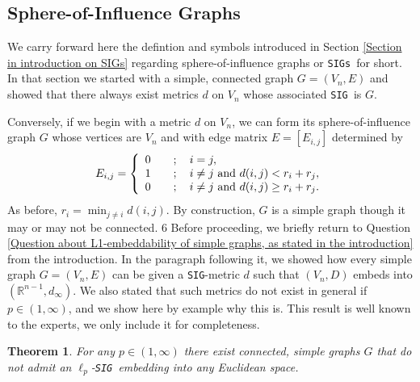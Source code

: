 \documentclass[12pt]{amsart}
\newtheorem{theorem}{Theorem}
\numberwithin{theorem}{section}
\theoremstyle{remark}
\newcommand{\sig}{{\tt SIG }}
\newcommand{\sigg}{{\tt SIG}}
\newcommand{\sigs}{{\tt SIGs }}
\begin{document}
\subsection{Sphere-of-Influence Graphs} \label{Subsection on sphere of influence graphs}
We carry forward here the defintion and symbols introduced in Section \ref{Section in introduction on SIGs} regarding sphere-of-influence graphs or \sigs for short. In that section we started with a simple, connected graph $G = (V_n,E)$ and  showed that there always exist metrics $d$ on $V_n$ whose associated \sig is $G$. 

Conversely, if we begin with a metric $d$ on $V_n$, we can form its sphere-of-influence graph $G$ whose vertices are $V_n$ and with edge matrix $E = [E_{i,j}]$ determined by 
$$ E_{i,j} = \left\{
\begin{array}{cl}
	0 & \quad ; \quad i=j, \cr 
1 & \quad ; \quad i\ne j \text{ and } d(i,j)<r_i+r_j, \cr 
0 & \quad ; \quad  i\ne j \text{ and } d(i,j)\ge r_i+r_j. 
\end{array} 
\right. $$ 
As before, $r_i = \min _{j\ne i} d(i,j)$. By construction, $G$ is a simple graph though it may or may not be connected. 6
\vskip3mm
Before proceeding, we briefly return to Question \ref{Question about L1-embeddability of simple graphs, as stated in the introduction} from the introduction. In the paragraph following it, we showed how every simple graph $G=(V_n,E)$ can be given a \sigg-metric $d$ such that $(V_n,D)$ embeds into $(\mathbb R^{n-1},d_\infty)$. We also stated that such metrics do not exist in general if $p\in (1,\infty)$, and we show here by example why this is. This result is well known to the experts, we only include it for completeness. 

\begin{theorem}
For any $p\in (1,\infty)$ there exist connected, simple graphs $G$ that do not admit an $\ell_p$-\sig embedding into any Euclidean space. 
\end{theorem}
\end{document}
